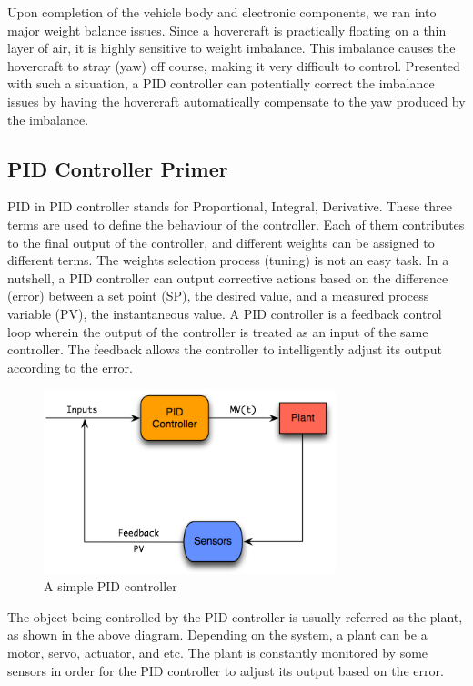 Upon completion of the vehicle body and electronic components, we ran into major weight balance issues. Since a hovercraft is practically floating on a thin layer of air, it is highly sensitive to weight imbalance. This imbalance causes the hovercraft to stray (yaw) off course, making it very difficult to control. Presented with such a situation, a PID controller can potentially correct the imbalance issues by having the hovercraft automatically compensate to the yaw produced by the imbalance.

\subsection{PID Controller Primer}
PID in PID controller stands for Proportional, Integral, Derivative. These three terms are used to define the behaviour of the controller. Each of them contributes to the final output of the controller, and different weights can be assigned to different terms. The weights selection process (tuning) is not an easy task. In a nutshell, a PID controller can output corrective actions based on the difference (error) between a set point (SP), the desired value, and a measured process variable (PV), the instantaneous value. A PID controller is a feedback control loop wherein the output of the controller is treated as an input of the same controller. The feedback allows the controller to intelligently adjust its output according to the error. 

\begin{figure}[h]
  \begin{center}
    \includegraphics[width=85mm]{imageSources/pidcontroller.png}
  \end{center}
  \caption{A simple PID controller} 
  \label{pidController}
\end{figure}

The object being controlled by the PID controller is usually referred as the plant, as shown in the above diagram. Depending on the system, a plant can be a motor, servo, actuator, and etc. The plant is constantly monitored by some sensors in order for the PID controller to adjust its output based on the error.

